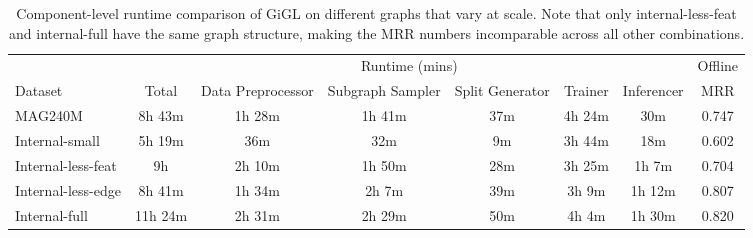 \begin{table*}[!htbp]
\centering
\caption{Component-level runtime comparison of GiGL on different graphs that vary at scale. Note that only internal-less-feat and internal-full have the same graph structure, making the MRR numbers incomparable across all other combinations.}
\label{tab:scale}
\vspace{-0.1in}
\begin{tabular}{l|cccccc|c} 
\toprule
 & \multicolumn{6}{c|}{Runtime (mins)} & Offline \\
Dataset & Total & Data Preprocessor & Subgraph Sampler & Split Generator & Trainer & Inferencer & MRR \\ 
\midrule
MAG240M & 8h 43m & 1h 28m & 1h 41m & 37m & 4h 24m & 30m & 0.747 \\
\cmidrule(lr){1-1} \cmidrule(lr){2-7} \cmidrule(lr){8-8}
Internal-small & 5h 19m & 36m & 32m & 9m & 3h 44m & 18m & 0.602 \\ 
Internal-less-feat & 9h & 2h 10m & 1h 50m & 28m & 3h 25m & 1h 7m & 0.704 \\
Internal-less-edge & 8h 41m & 1h 34m & 2h 7m & 39m & 3h 9m & 1h 12m & 0.807 \\
Internal-full & 11h 24m & 2h 31m & 2h 29m & 50m & 4h 4m & 1h 30m & 0.820\\
\bottomrule
\end{tabular}
\vspace{-0.1in}
\end{table*}